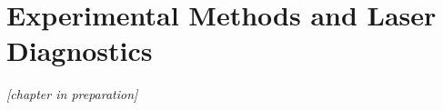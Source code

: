 \chapter{Experimental Methods and Laser Diagnostics}\label{ch:diagnostics}

\emph{[chapter in preparation]}

